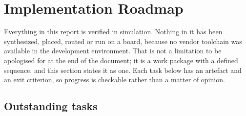 \documentclass[11pt,a4paper]{article}
\begin{document}
\section{Implementation Roadmap}
\label{sec:roadmap}

Everything in this report is verified in simulation. Nothing in it has been
synthesized, placed, routed or run on a board, because no vendor toolchain was
available in the development environment. That is not a limitation to be
apologised for at the end of the document; it is a work package with a defined
sequence, and this section states it as one. Each task below has an artefact and
an exit criterion, so progress is checkable rather than a matter of opinion.

\subsection{Outstanding tasks}
\end{document}
